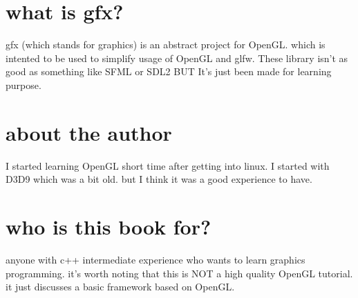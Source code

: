 \section*{what is gfx?}
  gfx (which stands for graphics) is an abstract project for OpenGL. 
  which is intented to be used to simplify usage of OpenGL and glfw.
  These library isn't as good as something
  like SFML or SDL2 BUT It's just been made for learning purpose.

\section*{about the author}
  I started learning OpenGL short time after getting into linux.
  I started with D3D9 which was a bit old. but I think it was a
  good experience to have.

\section*{who is this book for?}
  anyone with c++ intermediate experience who wants to learn graphics programming.
  it's worth noting that this is NOT a high quality OpenGL tutorial. it just discusses
  a basic framework based on OpenGL.
